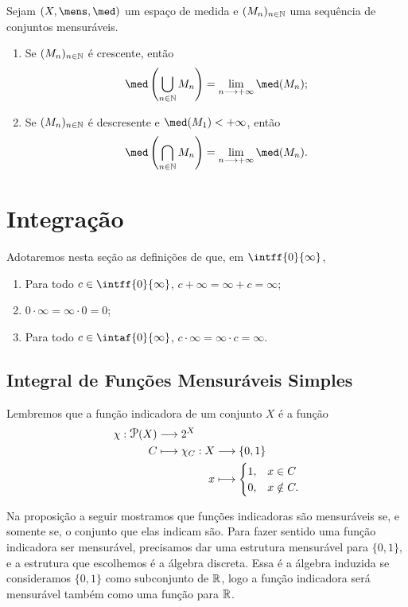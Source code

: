 \begin{prop}
Sejam $(X, \mens,\med)$ um espaço de medida e $(M_n)_{n \in \mathbb{N}}$ uma sequência de conjuntos mensuráveis.
	\begin{enumerate}
	\item Se $(M_n)_{n \in \mathbb{N}}$ é crescente, então
		\begin{equation*}
		\med \left( \bigcup_{n \in \N} M_n \right) = \lim_{n \to +\infty} \med(M_n);
		\end{equation*}
	\item Se $(M_n)_{n \in \mathbb{N}}$ é descresente e $\med(M_1) < + \infty$, então
		\begin{equation*}
		\med \left( \bigcap_{n \in \N} M_n \right) = \lim_{n \to +\infty} \med(M_n).
		\end{equation*}
	\end{enumerate}
\end{prop}


\chapter{Integração}

Adotaremos nesta seção as definições de que, em $\intff{0}{\infty}$,
	\begin{enumerate}
	\item Para todo $c \in \intff{0}{\infty}$, $c + \infty = \infty + c = \infty$;
	\item	$0 \cdot \infty = \infty \cdot 0 = 0$;
	\item Para todo $c \in \intaf{0}{\infty}$, $c \cdot \infty = \infty \cdot c = \infty$.
	\end{enumerate}

\section{Integral de Funções Mensuráveis Simples}

Lembremos que a função indicadora de um conjunto $X$ é a função
	\begin{align*}
	\func{\idc}{\p(X)}{2^X}{C}{
		\begin{aligned}[t]
		\func{\idc_C}{X}{\{0,1\}}{x}{
			\begin{cases}
			1,& x \in C \\
			0,& x \notin C.
			\end{cases}
		}
		\end{aligned}
	}
	\end{align*}

Na proposição a seguir mostramos que funções indicadoras são mensuráveis se, e somente se, o conjunto que elas indicam são. Para fazer sentido uma função indicadora ser mensurável, precisamos dar uma estrutura mensurável para $\{0,1\}$, e a estrutura que escolhemos é a álgebra discreta. Essa é a álgebra induzida se consideramos $\{0,1\}$ como subconjunto de $\mathbb{R}$, logo a função indicadora será mensurável também como uma função para $\mathbb{R}$.

